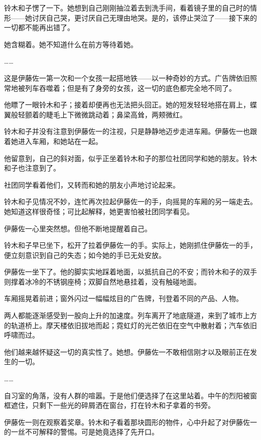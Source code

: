 铃木和子愣了一下。她想到自己刚刚抽泣着去到洗手间，看着镜子里的自己时的情形——她讨厌自己哭，更讨厌自己无理由地哭。是的，该停止哭泣了——接下来的一切都不能再出错了。

她含糊着。她不知道什么在前方等待着她。

……

这是伊藤佐一第一次和一个女孩一起搭地铁——以一种奇妙的方式。广告牌依旧照常地被列车吞噬着；但是有了身旁的女孩，这一切的底色都完全地不同了。

他瞟了一眼铃木和子；接着却便再也无法把头回正。她的短发轻轻地搭在肩上，蝶翼般轻颤着的睫毛上下微微跳动着；鼻梁高耸，两颊微红。

铃木和子并没有注意到伊藤佐一的注视，只是静静地迈步走进车厢。伊藤佐一也跟着她进入车厢，和她站在一起。

他留意到，自己的斜对面，似乎正坐着铃木和子的那位社团同学和她的朋友。铃木和子也注意到了。

社团同学看着他们，又转而和她的朋友小声地讨论起来。

铃木和子见情况不妙，连忙再次拉起伊藤佐一的手，向摇晃的车厢的另一端走去。她知道这样很奇怪；可比起解释，她更害怕被社团同学看见。

伊藤佐一心里突然想。但他不断地提醒着自己。


铃木和子早已坐下，松开了拉着伊藤佐一的手。实际上，她刚抓住伊藤佐一的手，便立刻意识到自己的失态；如今她的手已无处安放。

伊藤佐一坐下了。他的脚实实地踩着地面，以抵抗自己的不安；而铃木和子的双手则撑着冰冷的不锈钢座椅；双脚自然地悬挂着，没有触碰地面。

车厢摇晃着前进；窗外闪过一幅幅炫目的广告牌，刊登着不同的产品、人物。

两人都能逐渐感受到一股向上升的加速度。列车离开了地底隧道，来到了城市上方的轨道桥上。摩天楼依旧拔地而起；霓虹灯的光芒依旧在空气中散射着；汽车依旧呼啸而过。

他们越来越怀疑这一切的真实性了。她想。伊藤佐一不敢相信刚才以及眼前正在发生的一切。

……

自习室的角落，没有人群的喧嚣。于是他们便选择了在这里站着。中午的烈阳被窗框遮住，只剩下一些光的碎屑洒在窗台，打在铃木和子拿着的书旁。

伊藤佐一则在观察着奖章。铃木和子看着那块圆形的物件，心中升起了对伊藤佐一的一丝不可解释的警惕。可是她竟选择了先开口。

